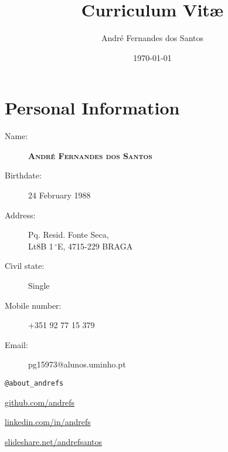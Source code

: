 \documentclass{article}
\author{André Fernandes dos Santos}
\title{Curriculum Vit\ae}
\date{\today}
\begin{document}
\maketitle

\section{Personal Information}
	\begin{description}
	\item [Name:] \large\textbf{\textsc{André Fernandes dos Santos}}
	\end{description}
\begin{multicols}{2}
	\begin{description}
	\item [Birthdate:] 24 February 1988
	\item [Address:] Pq. Resid. Fonte Seca,\\Lt8B 1$\,^{\circ}$E, 4715-229 BRAGA
	\item [Civil state:] Single
	\item [Mobile number:] +351 92 77 15 379
	\item [Email:] pg15973@alunos.uminho.pt
	\end{description}
	\vfill

	\columnbreak

	\begin{description}
		\small
		\item [Twitter:] \texttt{@about\_andrefs} 
		\item [GitHub:] \url{github.com/andrefs} 
		\item [LinkedIn:] \url{linkedin.com/in/andrefs}
		\item [SlideShare:] \url{slideshare.net/andrefsantos}
	\end{description}
	\vspace*{\fill}
\end{multicols}
\end{document}
